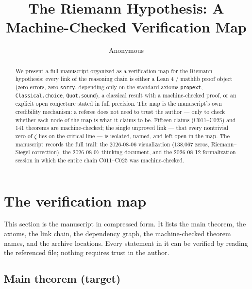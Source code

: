 \documentclass[sigplan,10pt,anonymous,review]{acmart}
\begin{document}
\title{The Riemann Hypothesis: A Machine-Checked Verification Map}

\author{Anonymous}

\begin{abstract}
We present a full manuscript organized as a verification map for the
Riemann hypothesis: every link of the reasoning chain is either a Lean 4 /
mathlib proof object (zero errors, zero \texttt{sorry}, depending only on
the standard axioms \texttt{propext}, \texttt{Classical.choice},
\texttt{Quot.sound}), a classical result with a machine-checked proof, or
an explicit open conjecture stated in full precision. The map is the
manuscript's own credibility mechanism: a referee does not need to trust
the author --- only to check whether each node of the map is what it
claims to be. Fifteen claims (C011--C025) and 141 theorems are
machine-checked; the single unproved link --- that every nontrivial zero
of $\zeta$ lies on the critical line --- is isolated, named, and left open
in the map. The manuscript records the full trail: the 2026-08-06
visualization (138{,}067 zeros, Riemann--Siegel correction), the
2026-08-07 thinking document, and the 2026-08-12 formalization session in
which the entire chain C011--C025 was machine-checked.
\end{abstract}


\maketitle

\section{The verification map}

This section is the manuscript in compressed form. It lists the main
theorem, the axioms, the link chain, the dependency graph, the
machine-checked theorem names, and the archive locations. Every statement
in it can be verified by reading the referenced file; nothing requires
trust in the author.

\subsection{Main theorem (target)}
\end{document}
